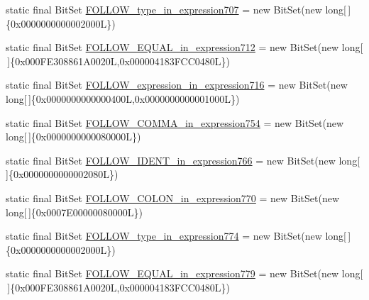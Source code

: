 \begin{DoxyCompactItemize}
static final Bit\-Set \hyperlink{classorg_1_1tzi_1_1use_1_1parser_1_1testsuite_1_1_test_suite_parser_a1166f460c48d44d0a25381b4e4ae101c}{F\-O\-L\-L\-O\-W\-\_\-type\-\_\-in\-\_\-expression707} = new Bit\-Set(new long\mbox{[}$\,$\mbox{]}\{0x0000000000002000\-L\})
\item 
static final Bit\-Set \hyperlink{classorg_1_1tzi_1_1use_1_1parser_1_1testsuite_1_1_test_suite_parser_ac4b848bc4c0ff72b4662db4c156e67d7}{F\-O\-L\-L\-O\-W\-\_\-\-E\-Q\-U\-A\-L\-\_\-in\-\_\-expression712} = new Bit\-Set(new long\mbox{[}$\,$\mbox{]}\{0x000\-F\-E308861\-A0020\-L,0x000004183\-F\-C\-C0480\-L\})
\item 
static final Bit\-Set \hyperlink{classorg_1_1tzi_1_1use_1_1parser_1_1testsuite_1_1_test_suite_parser_a6b019e24cfbec22be50aa6ae57c30727}{F\-O\-L\-L\-O\-W\-\_\-expression\-\_\-in\-\_\-expression716} = new Bit\-Set(new long\mbox{[}$\,$\mbox{]}\{0x0000000000000400\-L,0x0000000000001000\-L\})
\item 
static final Bit\-Set \hyperlink{classorg_1_1tzi_1_1use_1_1parser_1_1testsuite_1_1_test_suite_parser_ade50524ccd302ced87985cd44d16d358}{F\-O\-L\-L\-O\-W\-\_\-\-C\-O\-M\-M\-A\-\_\-in\-\_\-expression754} = new Bit\-Set(new long\mbox{[}$\,$\mbox{]}\{0x0000000000080000\-L\})
\item 
static final Bit\-Set \hyperlink{classorg_1_1tzi_1_1use_1_1parser_1_1testsuite_1_1_test_suite_parser_a56fae4f1f17f2f2b767242717383b469}{F\-O\-L\-L\-O\-W\-\_\-\-I\-D\-E\-N\-T\-\_\-in\-\_\-expression766} = new Bit\-Set(new long\mbox{[}$\,$\mbox{]}\{0x0000000000002080\-L\})
\item 
static final Bit\-Set \hyperlink{classorg_1_1tzi_1_1use_1_1parser_1_1testsuite_1_1_test_suite_parser_a094f023cb3ccdbca5d12719b9b465416}{F\-O\-L\-L\-O\-W\-\_\-\-C\-O\-L\-O\-N\-\_\-in\-\_\-expression770} = new Bit\-Set(new long\mbox{[}$\,$\mbox{]}\{0x0007\-E00000080000\-L\})
\item 
static final Bit\-Set \hyperlink{classorg_1_1tzi_1_1use_1_1parser_1_1testsuite_1_1_test_suite_parser_a11bc8bbe722aa2665445ac4dcc9231d4}{F\-O\-L\-L\-O\-W\-\_\-type\-\_\-in\-\_\-expression774} = new Bit\-Set(new long\mbox{[}$\,$\mbox{]}\{0x0000000000002000\-L\})
\item 
static final Bit\-Set \hyperlink{classorg_1_1tzi_1_1use_1_1parser_1_1testsuite_1_1_test_suite_parser_a55819df8715fc08df8a98c609f7e3862}{F\-O\-L\-L\-O\-W\-\_\-\-E\-Q\-U\-A\-L\-\_\-in\-\_\-expression779} = new Bit\-Set(new long\mbox{[}$\,$\mbox{]}\{0x000\-F\-E308861\-A0020\-L,0x000004183\-F\-C\-C0480\-L\})
\item 

\end{DoxyCompactItemize}

